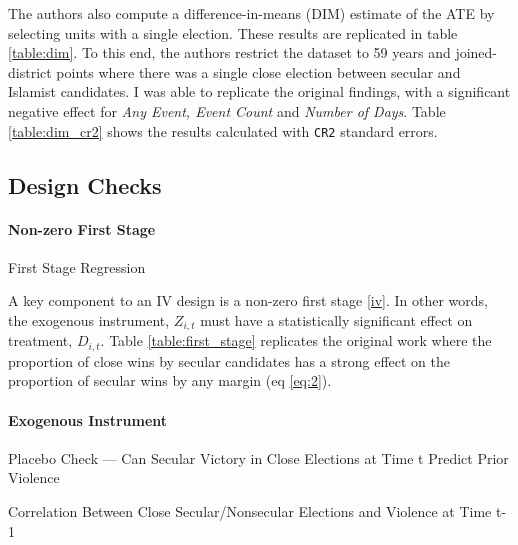 \documentclass{scrartcl}
\begin{document}
The authors also compute a difference-in-means (DIM) estimate of the ATE by selecting units with a single election. 
These results are replicated in table \ref{table:dim}.
To this end, the authors restrict the dataset to 59 years and joined-district points where there was a single close election between secular and Islamist candidates. I was able to replicate the original findings, with a significant negative effect for \textit{Any Event, Event Count} and \textit{Number of Days}.
Table \ref{table:dim_cr2} shows the results calculated with \texttt{CR2} standard errors. 

\subsection{Design Checks}
\paragraph{Non-zero First Stage}

\begin{table}[ht]
  \begin{center}
    \scalebox{0.85}{
      
    }
    \caption{First Stage Regression}
    \label{table:first_stage}
  \end{center}
\end{table}

A key component to an IV design is a non-zero first stage \ref{iv}. In other words, the exogenous instrument, $Z_{i,t}$ must have a statistically significant effect on treatment, $D_{i,t}$.
Table \ref{table:first_stage} replicates the original work where the proportion of close wins by secular candidates has a strong effect on the proportion of secular wins by any margin (eq \ref{eq:2}).


\paragraph{Exogenous Instrument} \label{exo}
\begin{table}[ht]
  \begin{center}
    \scalebox{0.75}{
      
    }
    \caption{Placebo Check — Can Secular Victory in Close Elections at Time t Predict Prior Violence}
    \label{table:placebo}
  \end{center}
\end{table}
\begin{table}[ht]
  \begin{center}
    \scalebox{0.75}{
      
    }
    \caption{Correlation Between Close Secular/Nonsecular Elections and Violence at Time t-1}
    \label{table:4}
  \end{center}
\end{table}
\end{document}
